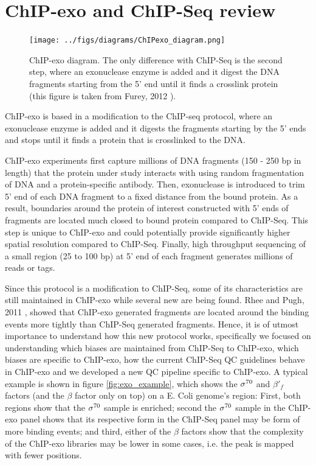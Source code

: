 \documentclass[11pt]{article}\usepackage[]{graphicx}\usepackage[]{color}
\begin{document}
\section{ChIP-exo and ChIP-Seq review}
\label{sec:exo}

\begin{figure}
\centering
\texttt{[image: ../figs/diagrams/ChIPexo\_diagram.png]}
\caption{ChIP-exo diagram. The only difference with ChIP-Seq is the
  second step, where an exonuclease enzyme is added and it digest the
  DNA fragments starting from the 5' end until it finds a crosslink
  protein (this figure is taken from Furey, 2012 \cite{chipbeyond}).}
\label{fig:exo}
\end{figure}

ChIP-exo is based in a modification to the ChIP-seq protocol, where an
exonuclease enzyme is added and it digests the fragments starting by
the 5' ends and stops until it finds a protein that is crosslinked to
the DNA.

ChIP-exo experiments first capture millions of DNA fragments
(150 - 250 bp in length) that the protein under study interacts with
using random fragmentation of DNA and a protein-specific
antibody. Then, exonuclease is introduced to trim 5' end of each DNA
fragment to a fixed distance from the bound protein. As a result,
boundaries around the protein of interest constructed with 5' ends of
fragments are located much closed to bound protein compared to
ChIP-Seq. This step is unique to ChIP-exo and could potentially
provide significantly higher spatial resolution compared to
ChIP-Seq. Finally, high throughput sequencing of a small region (25 to
100 bp) at 5' end of each fragment generates millions of reads or
tags.

Since this protocol is a modification to ChIP-Seq, some of its
characteristics are still maintained in ChIP-exo while several new are
being found. Rhee and Pugh, 2011 \cite{exo1}, showed that ChIP-exo
generated fragments are located around the binding events more tightly
than ChIP-Seq generated fragments. Hence, it is of utmost importance
to understand how this new protocol works, specifically we focused on
understanding which biases are maintained from ChIP-Seq to ChIP-exo,
which biases are specific to ChIP-exo, how the current ChIP-Seq QC
guidelines behave in ChIP-exo and we developed a new QC pipeline
specific to ChIP-exo. A typical example is shown in figure
\ref{fig:exo_example}, which shows the $\sigma^{70}$ and $\beta'_f$ factors
(and the $\beta$ factor only on top) on a E. Coli genome's region:
First, both regions show that the $\sigma^{70}$ sample is enriched; second
the $\sigma^{70}$ sample in the ChIP-exo panel shows that its respective form
in the ChIP-Seq panel may be form of more binding events; and third,
either of the $\beta$ factors show that the complexity of the ChIP-exo
libraries may be lower in some cases, i.e. the peak is mapped with
fewer positions.
\end{document}
